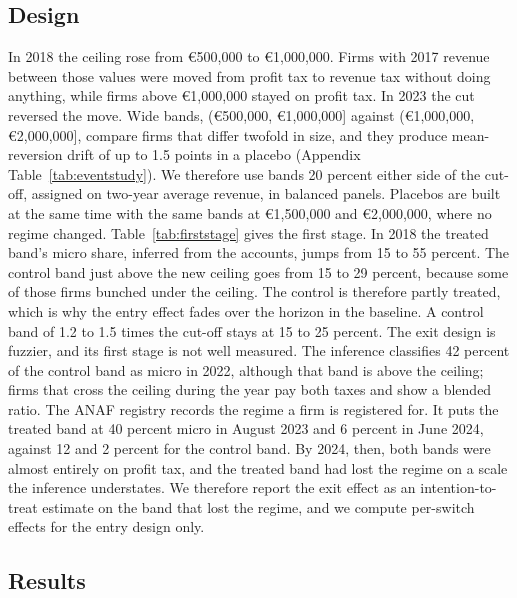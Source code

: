 \documentclass[12pt]{article}
\begin{document}
\subsection{Design}

In 2018 the ceiling rose from \euro{}500,000 to \euro{}1,000,000. Firms with 2017 revenue between those values were moved from profit tax to revenue tax without doing anything, while firms above \euro{}1,000,000 stayed on profit tax. In 2023 the cut reversed the move. Wide bands, (\euro{}500,000, \euro{}1,000,000] against (\euro{}1,000,000, \euro{}2,000,000], compare firms that differ twofold in size, and they produce mean-reversion drift of up to 1.5 points in a placebo (Appendix Table~\ref{tab:eventstudy}). We therefore use bands 20 percent either side of the cut-off, assigned on two-year average revenue, in balanced panels. Placebos are built at the same time with the same bands at \euro{}1,500,000 and \euro{}2,000,000, where no regime changed. Table~\ref{tab:firststage} gives the first stage. In 2018 the treated band's micro share, inferred from the accounts, jumps from 15 to 55 percent. The control band just above the new ceiling goes from 15 to 29 percent, because some of those firms bunched under the ceiling. The control is therefore partly treated, which is why the entry effect fades over the horizon in the baseline. A control band of 1.2 to 1.5 times the cut-off stays at 15 to 25 percent. The exit design is fuzzier, and its first stage is not well measured. The inference classifies 42 percent of the control band as micro in 2022, although that band is above the ceiling; firms that cross the ceiling during the year pay both taxes and show a blended ratio. The ANAF registry records the regime a firm is registered for. It puts the treated band at 40 percent micro in August 2023 and 6 percent in June 2024, against 12 and 2 percent for the control band. By 2024, then, both bands were almost entirely on profit tax, and the treated band had lost the regime on a scale the inference understates. We therefore report the exit effect as an intention-to-treat estimate on the band that lost the regime, and we compute per-switch effects for the entry design only.



\subsection{Results}
\end{document}
